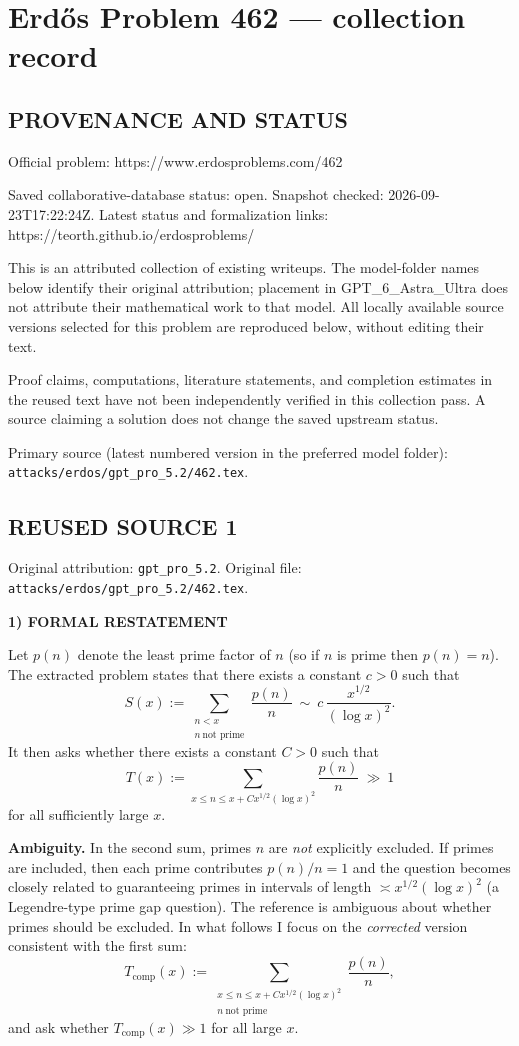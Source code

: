 \section*{Erd\H{o}s Problem 462 --- collection record}

\subsection*{PROVENANCE AND STATUS}
Official problem: https://www.erdosproblems.com/462

Saved collaborative-database status: open.
Snapshot checked: 2026-09-23T17:22:24Z.
Latest status and formalization links: https://teorth.github.io/erdosproblems/

This is an attributed collection of existing writeups. The model-folder names below identify their original attribution; placement in GPT\_6\_Astra\_Ultra does not attribute their mathematical work to that model. All locally available source versions selected for this problem are reproduced below, without editing their text.

Proof claims, computations, literature statements, and completion estimates in the reused text have not been independently verified in this collection pass. A source claiming a solution does not change the saved upstream status.

Primary source (latest numbered version in the preferred model folder): \texttt{attacks/erdos/gpt\_pro\_5.2/462.tex}.

\subsection*{REUSED SOURCE 1}
Original attribution: \texttt{gpt\_pro\_5.2}.
Original file: \texttt{attacks/erdos/gpt\_pro\_5.2/462.tex}.


\noindent\textbf{1) FORMAL RESTATEMENT}

Let $p(n)$ denote the least prime factor of $n$ (so if $n$ is prime then $p(n)=n$).
The extracted problem states that there exists a constant $c>0$ such that
\[S(x):=\sum_{\substack{n<x\\ n\ \textrm{not prime}}}\frac{p(n)}{n}\ \sim\ c\,\frac{x^{1/2}}{(\log x)^2}.
\]
It then asks whether there exists a constant $C>0$ such that
\[T(x):=\sum_{x\le n\le x+C x^{1/2}(\log x)^2}\frac{p(n)}{n}\ \gg\ 1\]
for all sufficiently large $x$.

\textbf{Ambiguity.} In the second sum, primes $n$ are \emph{not} explicitly excluded. If primes are included, then each prime contributes $p(n)/n=1$ and the question becomes closely related to guaranteeing primes in intervals of length $\asymp x^{1/2}(\log x)^2$ (a Legendre-type prime gap question).  The reference is ambiguous about whether primes should be excluded.  In what follows I focus on the \emph{corrected} version consistent with the first sum:
\[T_{\mathrm{comp}}(x):=\sum_{\substack{x\le n\le x+C x^{1/2}(\log x)^2\\ n\ \textrm{not prime}}}\frac{p(n)}{n},\]
and ask whether $T_{\mathrm{comp}}(x)\gg 1$ for all large $x$.

